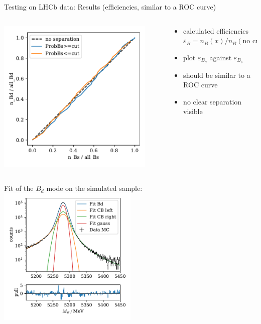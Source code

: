 \documentclass[aspectratio=1610, 10pt]{beamer}
\begin{document}
\begin{frame}{Testing on LHCb data: Results (efficiencies, similar to a ROC curve)}
  \begin{columns}
    \begin{column}{0.5\textwidth}
      \centering
      \includegraphics[width=0.9\textwidth]{images/data_roc.pdf}
    \end{column}
    \begin{column}{0.5\textwidth}
      \begin{itemize}
        \item calculated efficiencies $\varepsilon_B = n_B(x)/n_B(\text{no cut})$
        \item plot $\varepsilon_{B_d}$ against $\varepsilon_{B_s}$
        \item should be similar to a ROC curve
        \item no clear separation visible
      \end{itemize}
    \end{column}
  \end{columns}
\end{frame}

\begin{frame}{Fit of the $B_d$ mode on the simulated sample:}
  \centering
  \includegraphics[width=0.5\textwidth]{images/fit_mc.pdf}
\end{frame}
\end{document}
